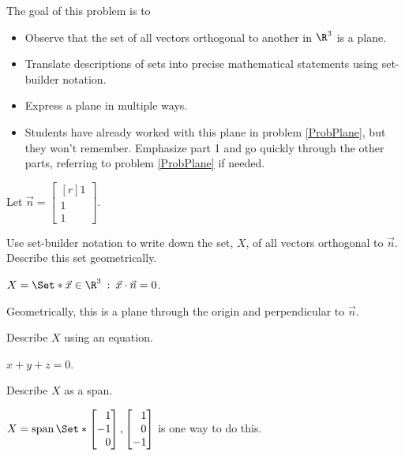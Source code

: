 \documentclass{problemset}
\DeclareMathOperator{\Span}{span}
\newcommand{\mat}[1]{\begin{bmatrix*}[r]#1\end{bmatrix*}}
\providecommand\given{}
\newcommand\SetSymbol[1][]{%
	\nonscript\::%
	\allowbreak
	\nonscript\:
	\mathopen{}}
\renewcommand\given{\SetSymbol[\delimsize]}
\begin{document}
	\question
	\begin{annotation}
		\begin{goals}

			The goal of this problem is to
			\begin{itemize}
				\item Observe that the set of all vectors orthogonal to another in $\R^3$
					is a plane.
				\item Translate descriptions of sets into precise mathematical statements using
					set-builder notation.
				\item Express a plane in multiple ways.
			\end{itemize}
		\end{goals}

		\begin{notes}
			\begin{itemize}
				\item Students have already worked with this plane in problem \ref{ProbPlane},
					but they won't remember. Emphasize part 1 and go quickly through the other parts,
					referring to problem \ref{ProbPlane} if needed.
			\end{itemize}
		\end{notes}
	\end{annotation}
	Let $\vec n=\mat{1\\1\\1}$.
	\begin{parts}
		\item Use set-builder notation to write down the set, $X$, of
			all vectors orthogonal to $\vec n$. Describe this set
			geometrically.
			\begin{solution}
				$X = \Set*{\vec x\in \R^3 \given \vec x\cdot \vec n = 0}$.

				Geometrically, this is a plane through the origin and
				perpendicular to $\vec n$.
			\end{solution}
		\item Describe $X$ using an equation.
			\begin{solution}[inline]
				$x+y+z=0$.
			\end{solution}
		\item Describe $X$ as a span.
			\begin{solution}[inline]
				$X = \Span\Set*{\mat{1\\-1\\0},\mat{1\\0\\-1}}$ is one way to do this.
			\end{solution}
	\end{parts}
\end{document}
